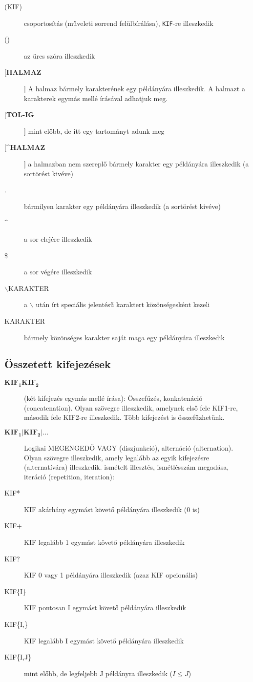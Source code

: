 \begin{description}
 \item[(KIF)] csoportosítás (műveleti sorrend felülbírálása), \texttt{KIF}-re illeszkedik
 \item[{()}] az üres szóra illeszkedik
 \item[ [\textbf{HALMAZ}] \hspace{-3mm} ]\hspace{+3mm}  A halmaz bármely karakterének egy példányára illeszkedik. A halmazt a karakterek egymás mellé írásával adhatjuk meg.
\item[ [\textbf{TOL-IG}] \hspace{-3mm} ]\hspace{+3mm}  mint előbb, de itt egy tartományt adunk meg
\item[ [\textasciicircum \textbf{HALMAZ}] \hspace{-3mm} ]\hspace{+3mm}  a halmazban nem szereplő bármely karakter egy példányára illeszkedik (a sortörést kivéve)
\item[ . ] bármilyen karakter egy példányára illeszkedik (a sortörést kivéve)
\item[ \textasciicircum ] a sor elejére illeszkedik
\item[\$] a sor végére illeszkedik
\item[$\backslash$KARAKTER] a $\backslash$ után írt speciális jelentésű karaktert közönségesként kezeli
\item[KARAKTER] bármely közönséges karakter saját maga egy példányára illeszkedik
\end{description}

\subsection{Összetett kifejezések}
\begin{description}
\item[$\mathbf{KIF_1KIF_2}$] (két kifejezés egymás mellé írása): Összefűzés, konkatenáció (concatenation). Olyan szövegre illeszkedik, amelynek első fele KIF1-re, második fele KIF2-re illeszkedik. Több kifejezést is összefűzhetünk.
\item[$\mathbf{KIF_1|KIF_2|\dots}$] Logikai MEGENGEDŐ VAGY (diszjunkció), alternáció (alternation). 
	Olyan szövegre il\-lesz\-ke\-dik, amely legalább az egyik kifejezésre (alternatívára) illeszkedik.
ismételt illesztés, ismétlésszám megadása, iteráció (repetition, iteration):
\item[KIF*] KIF akárhány egymást követő példányára illeszkedik (0 is)
\item[KIF+] KIF legalább 1 egymást követő példányára illeszkedik
\item[KIF?] KIF 0 vagy 1 példányára illeszkedik (azaz KIF opcionális)
\item[KIF\{I\}] KIF pontosan I egymást követő példányára illeszkedik
\item[KIF\{I,\}] KIF legalább I egymást követő példányára illeszkedik
\item[KIF\{I,J\}] mint előbb, de legfeljebb J példányra illeszkedik ($I\leq J$)
\end{description}

